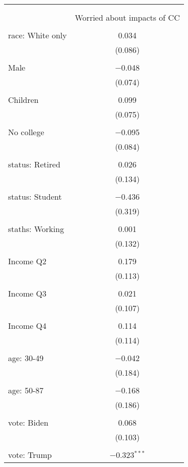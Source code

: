 
\begin{tabular}{@{\extracolsep{5pt}}lc} 
\\[-1.8ex]\hline 
\hline \\[-1.8ex] 
\\[-1.8ex] & Worried about impacts of CC \\ 
\hline \\[-1.8ex] 
 race: White only & 0.034 \\ 
  & (0.086) \\ 
  & \\ 
 Male & $-$0.048 \\ 
  & (0.074) \\ 
  & \\ 
 Children & 0.099 \\ 
  & (0.075) \\ 
  & \\ 
 No college & $-$0.095 \\ 
  & (0.084) \\ 
  & \\ 
 status: Retired & 0.026 \\ 
  & (0.134) \\ 
  & \\ 
 status: Student & $-$0.436 \\ 
  & (0.319) \\ 
  & \\ 
 staths: Working & 0.001 \\ 
  & (0.132) \\ 
  & \\ 
 Income Q2 & 0.179 \\ 
  & (0.113) \\ 
  & \\ 
 Income Q3 & 0.021 \\ 
  & (0.107) \\ 
  & \\ 
 Income Q4 & 0.114 \\ 
  & (0.114) \\ 
  & \\ 
 age: 30-49 & $-$0.042 \\ 
  & (0.184) \\ 
  & \\ 
 age: 50-87 & $-$0.168 \\ 
  & (0.186) \\ 
  & \\ 
 vote: Biden & 0.068 \\ 
  & (0.103) \\ 
  & \\ 
 vote: Trump & $-$0.323$^{***}$ \\ 

\end{tabular}

